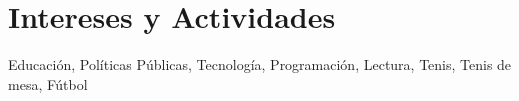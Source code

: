 \documentclass[a4paper,10pt]{article}
\begin{document}
\section{Intereses y Actividades}
Educación, Políticas Públicas, Tecnología, Programación, Lectura, Tenis, Tenis de mesa, Fútbol	\\


%		
%		
%		
%		
%		
\end{document}
